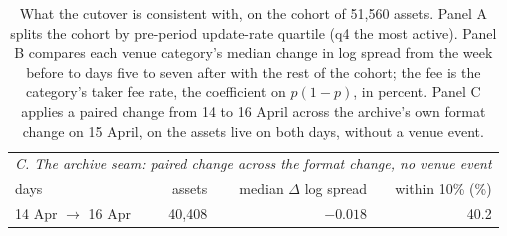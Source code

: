 \begin{table}[htbp]
\begin{tabular}{lrrr}
\toprule
\multicolumn{4}{l}{\emph{C. The archive seam: paired change across the format change, no venue event}} \\
days & assets & median $\Delta$ log spread & within 10\% (\%) \\
\midrule
14 Apr $\to$ 16 Apr & 40{,}408 & $-0.018$ & 40.2 \\
\bottomrule
\end{tabular}
\caption{What the cutover is consistent with, on the cohort of 51{,}560 assets. Panel A splits the cohort by pre-period update-rate quartile (q4 the most active). Panel B compares each venue category's median change in log spread from the week before to days five to seven after with the rest of the cohort; the fee is the category's taker fee rate, the coefficient on $p(1-p)$, in percent. Panel C applies a paired change from 14 to 16 April across the archive's own format change on 15 April, on the assets live on both days, without a venue event.}
\label{tab:mechanisms}
\end{table}
